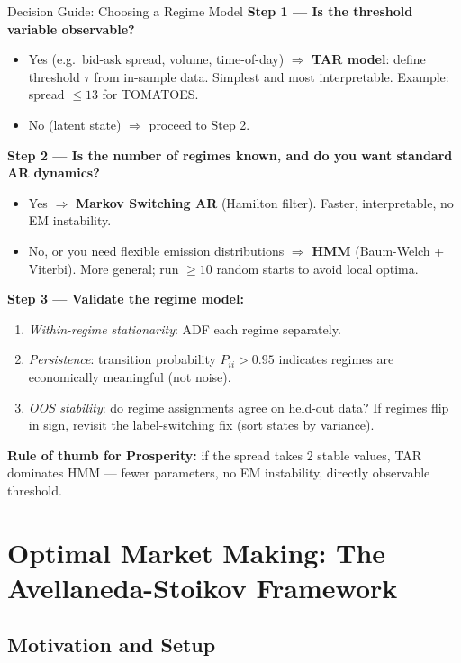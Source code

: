 \documentclass[12pt,a4paper,openany]{report}
\theoremstyle{definition}
\begin{document}
\begin{keyconceptbox}{Decision Guide: Choosing a Regime Model}
\textbf{Step 1 — Is the threshold variable observable?}
\begin{itemize}
  \item Yes (e.g.\ bid-ask spread, volume, time-of-day) $\Rightarrow$ \textbf{TAR model}: define threshold $\tau$ from in-sample data. Simplest and most interpretable. Example: spread $\leq 13$ for TOMATOES.
  \item No (latent state) $\Rightarrow$ proceed to Step 2.
\end{itemize}
\textbf{Step 2 — Is the number of regimes known, and do you want standard AR dynamics?}
\begin{itemize}
  \item Yes $\Rightarrow$ \textbf{Markov Switching AR} (Hamilton filter). Faster, interpretable, no EM instability.
  \item No, or you need flexible emission distributions $\Rightarrow$ \textbf{HMM} (Baum-Welch + Viterbi). More general; run $\geq 10$ random starts to avoid local optima.
\end{itemize}
\textbf{Step 3 — Validate the regime model:}
\begin{enumerate}[label=\arabic*.]
  \item \textit{Within-regime stationarity}: ADF each regime separately.
  \item \textit{Persistence}: transition probability $P_{ii} > 0.95$ indicates regimes are economically meaningful (not noise).
  \item \textit{OOS stability}: do regime assignments agree on held-out data? If regimes flip in sign, revisit the label-switching fix (sort states by variance).
\end{enumerate}
\textbf{Rule of thumb for Prosperity:} if the spread takes 2 stable values, TAR dominates HMM — fewer parameters, no EM instability, directly observable threshold.
\end{keyconceptbox}


\chapter{Optimal Market Making: The Avellaneda-Stoikov Framework}

\section{Motivation and Setup}
\end{document}
